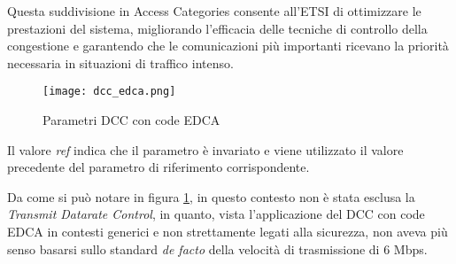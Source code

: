 Questa suddivisione in Access Categories consente all'ETSI di ottimizzare le prestazioni del sistema, migliorando l'efficacia delle tecniche di controllo della congestione e garantendo che le comunicazioni più importanti ricevano la priorità necessaria in situazioni di traffico intenso.

\begin{figure}[h!]
    \centering
    \texttt{[image: dcc\_edca.png]}
    \caption{Parametri DCC con code EDCA}
    \label{fig:dcc_edca}
\end{figure}

Il valore \textit{ref} indica che il parametro è invariato e viene utilizzato il valore precedente del parametro di riferimento corrispondente.

Da come si può notare in figura \ref{fig:dcc_edca}, in questo contesto non è stata esclusa la \textit{Transmit Datarate Control}, in quanto, vista l'applicazione del DCC con code EDCA in contesti generici e non strettamente legati alla sicurezza, non aveva più senso basarsi sullo standard \textit{de facto} della velocità di trasmissione di 6 Mbps.

